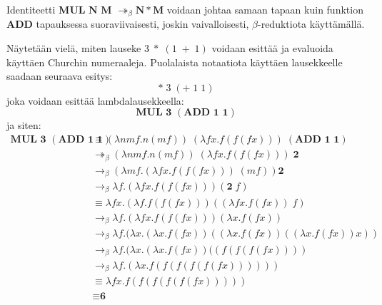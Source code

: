 Identiteetti $\textbf{MUL N M } \twoheadrightarrow_{\beta}\textbf{N} * \textbf{M}$ voidaan johtaa samaan tapaan kuin funktion \textbf{ADD} tapauksessa suoraviivaisesti, joskin vaivalloisesti, $\beta$-reduktiota käyttämällä. 
\par
Näytetään vielä, miten lauseke $3 \; * \; (1  \; + \; 1)$ voidaan esittää ja evaluoida käyttäen Churchin numeraaleja. Puolalaista notaatiota käyttäen lausekkeelle saadaan seuraava esitys:
\[* \; 3 \; (+ \; 1 \; 1) \] 
joka voidaan esittää lambdalausekkeella:
\[ \textbf{MUL 3 }(\textbf{ADD 1 1}) \]
ja siten:
\begin{align*}
\textbf{MUL 3 }(\textbf{ADD 1 1}) &\equiv (\lambda n m f . n (mf))  \; (\lambda f x . f(f(fx))) \;(\textbf{ADD 1 1}) \\
&\twoheadrightarrow_{\beta} (\lambda n m f . n (mf) ) \; (\lambda f x . f(f(fx))) \; \textbf{2} \\
&\rightarrow_{\beta} (\lambda m f . (\lambda f x . f(f(fx))) \; (m f)) \textbf{2}    \\
&\rightarrow_{\beta} \lambda f . (\lambda f x . f(f(fx))) (\textbf{2} \; f) \\
&\equiv \lambda f x . (\lambda f . f(f(fx))) ((\lambda f x . f (f x)) \; f) \\
&\rightarrow_{\beta} \lambda f . (\lambda f x .  f(f(fx))) (\lambda x . f (f x)) \\
&\rightarrow_{\beta} \lambda f . (\lambda x .  (\lambda x . f (f x))((\lambda x . f (f x))((\lambda x . f (f x))x))\\
&\rightarrow_{\beta} \lambda f . (\lambda x .  (\lambda x . f (f x))((f (f( f( f x))))  \\
&\rightarrow_{\beta} \lambda f . (\lambda x . f( f (f (f( f( f x)))))) \\
&\equiv \lambda f x. f( f (f (f( f( f x))))) \\
&\equiv \textbf{6}
\end{align*} 

